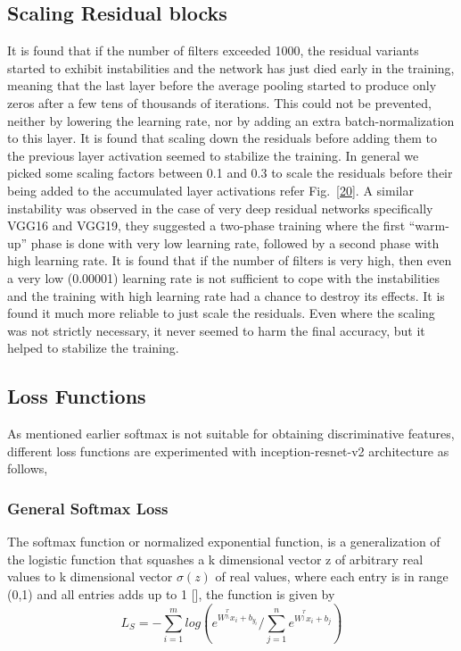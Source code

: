 \documentclass[a4paper,12pt, twoside]{NITKReport}
\begin{document}
\subsection{Scaling Residual blocks}
\par It is found that if the number of filters exceeded 1000, the residual variants started to exhibit instabilities and the network has just died early in the training, meaning that the last layer before the average pooling started to produce only zeros after a few tens of thousands of iterations. This could not be prevented, neither by lowering the learning rate, nor by adding an extra batch-normalization to this layer. It is found that scaling down the residuals before adding them to the previous layer activation seemed to stabilize the
training. In general we picked some scaling factors between 0.1 and 0.3 to scale the residuals before their being added to the accumulated layer activations refer Fig.~\ref{20}. A similar instability was observed in the case of very deep residual networks specifically VGG16 and VGG19, they suggested a two-phase training where the first “warm-up” phase is done with  very  low  learning  rate,  followed  by  a  second  phase with  high  learning  rate. It is found that if the number of filters is very high, then even a very low (0.00001) learning rate is not sufficient to cope with the instabilities and the training with high learning rate had a chance to destroy its effects. It is found it much more reliable to just scale the
residuals. Even  where  the  scaling  was  not  strictly  necessary,  it
never seemed to harm the final accuracy,  but it helped to stabilize the training.

\subsection{Loss Functions}
\par As mentioned earlier softmax is not suitable for obtaining discriminative features, different loss functions are experimented with inception-resnet-v2 architecture as follows,

\subsubsection{General Softmax Loss}
\par  The softmax function or normalized exponential function, is a generalization of the logistic function that squashes a k dimensional vector z of arbitrary real values to k dimensional vector $\sigma (z)$ of real values, where each entry is in range (0,1) and all entries adds up to 1 [\cite{100}], the function is given by
\begin{equation}
L_{S} = -\sum_{i=1}^{m}log (e^{W^{_{y_{i}}^{T}}x_{i}+b_{y_{i}}} / \sum_{j=1}^{n} e^{W^{_{j}^{T}}x_{i}+b_{j}})
\end{equation}
\end{document}
